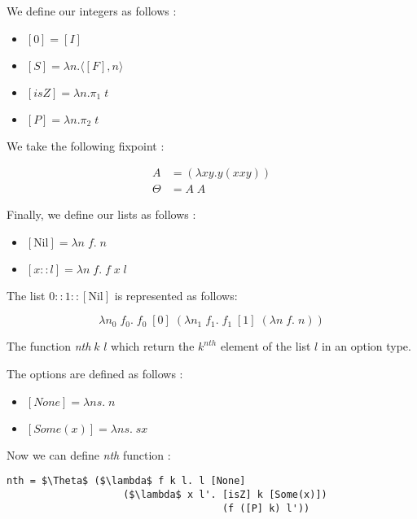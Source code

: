 \documentclass{article}
\theoremstyle{plain}
\newcommand{\nil}{[\text{Nil}]}
\newcommand{\nth}{\textit{nth}}
\begin{document}
  We define our integers as follows :

  \begin{multicols}{2}
    \begin{itemize}
      \item $[0] = [I]$
      \item $[S] = \lambda n. \langle [F], n\rangle$
      \item $[\textit{isZ}] = \lambda n. \pi_1\;t$
      \item $[P] = \lambda n. \pi_2\;t$
    \end{itemize}
  \end{multicols}

  We take the following fixpoint :

  \begin{align*}
    A &= (\lambda xy.y(xxy)) \\
    \Theta &= A\;A
  \end{align*}

  Finally, we define our lists as follows :

  \begin{itemize}
    \item $\nil = \lambda n\;f.\; n$
    \item $[x :: l] = \lambda n\;f.\; f\; x\; l$
  \end{itemize}

  \begin{center}
    The list $0 :: 1 :: \nil$ is represented as follows:
  \end{center}
  $$\lambda n_0\; f_0.\; f_0\; [0]\; (\lambda n_1\;f_1.\; f_1\;[1]\;(\lambda
  n\;f.\;n))$$

  The function \nth $\;k$ $l$ which return the
  $k^{nth}$ element of the list $l$ in an option type.

  The options are defined as follows :

  \begin{itemize}
    \item $[\textit{None}] = \lambda n s.\;n$
    \item $[\textit{Some}(x)] = \lambda n s.\;s x$
  \end{itemize}

  Now we can define \textit{nth} function :

    \begin{lstlisting}[caption=Nth function on list, mathescape=true]
nth = $\Theta$ ($\lambda$ f k l. l [None]
                    ($\lambda$ x l'. [isZ] k [Some(x)])
                                     (f ([P] k) l'))
    \end{lstlisting}
\end{document}
